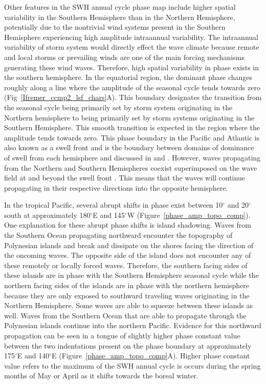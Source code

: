 \documentclass[draft,linenumbers]{agujournal2018}
\begin{document}
Other features in the SWH annual cycle phase map include higher spatial variability in the Southern Hemisphere than in the Northern Hemisphere, potentially due to the nontrivial wind systems present in the Southern Hemisphere experiencing high amplitude intraannual variability. The intraannual variability of storm system would directly effect the wave climate because remote and local storms or prevailing winds are one of the main forcing mechanisms generating these wind waves. Therefore, high spatial variability in phase exists in the southern hemisphere. In the equatorial region, the dominant phase changes roughly along a line where the amplitude of the seasonal cycle tends towards zero (Fig~\ref{Ifremer_ccmp2_lsf_chars}A). This boundary designates the transition from the seasonal cycle being primarily set by storm system originating in the Northern hemisphere to being primarily set by storm systems originating in the Southern Hemisphere. This smooth transition is expected in the region where the amplitude tends towards zero. This phase boundary in the Pacific and Atlantic is also known as a swell front \cite{young1999seasonal} and is the boundary between domains of dominance of swell from each hemisphere and discussed in \citet{semedo2011global} and \citet{jiang2013global}. However, waves propagating from the Northern and Southern Hemispheres coexist superimposed on the wave field at and beyond the swell front \cite{echevarria2019seasonal}. This means that the waves will continue propagating in their respective directions into the opposite hemisphere.

In the tropical Pacific, several abrupt shifts in phase exist between 10$^{\circ}$ and 20$^{\circ}$ south at approximately 180$^{\circ}$E and 145$^{\circ}$W (Figure~\ref{phase_amp_topo_comp}). One explanation for these abrupt phase shifts is island shadowing. Waves from the Southern Ocean propagating northward encounter the topography of Polynesian islands and break and dissipate on the shores facing the direction of the oncoming waves. The opposite side of the island does not encounter any of these remotely or locally forced waves. Therefore, the southern facing sides of these islands are in phase with the Southern Hemisphere seasonal cycle while the northern facing sides of the islands are in phase with the northern hemisphere because they are only exposed to southward traveling waves originating in the Northern Hemisphere. Some waves are able to squeeze between these islands as well. Waves from the Southern Ocean that are able to propagate through the Polynesian islands continue into the northern Pacific. Evidence for this northward propagation can be seen in a tongue of slightly higher phase constant value between the two indentations present on the phase boundary at approximately 175$^{\circ}$E and 140$^{\circ}$E (Figure~\ref{phase_amp_topo_comp}A). Higher phase constant value refers to the maximum of the SWH annual cycle is occurs during the spring months of May or April as it shifts towards the boreal winter. 
\end{document}
